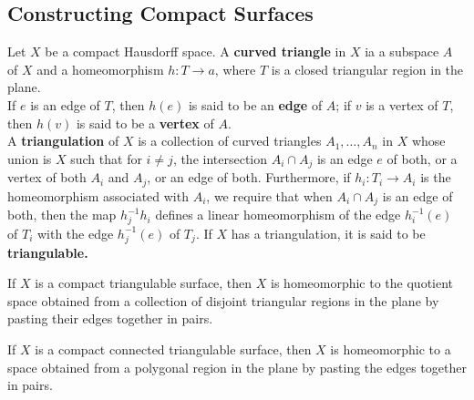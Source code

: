 \subsection{Constructing Compact Surfaces}

\begin{definition}
Let $X$ be a compact Hausdorff space. A \textbf{curved triangle} in $X$ ia a subspace $A$ of $X$ and a homeomorphism $h \colon T \rightarrow a$, 
where $T$ is a closed triangular region in the plane. \\

If $e$ is an edge of $T$, then $h(e)$ is said to be an \textbf{edge} of $A$; if $v$ is a vertex of $T$, then $h(v)$ is said to be a \textbf{vertex} of $A$. \\

A \textbf{triangulation} of $X$ is a collection of curved triangles $A_1, \dots, A_n$ in $X$ whose union is $X$ such that for $i \neq j$, 
the intersection $A_i \cap A_j$ is an edge $e$ of both, or a vertex of both $A_i$ and $A_j$, or an edge of both. Furthermore, if $h_i \colon T_i \rightarrow A_i$ is the
homeomorphism associated with $A_i$, we require that when $A_i \cap A_j$ is an edge of both, then the map $h_j^{-1}h_i$ defines a linear homeomorphism
of the edge $h_i^{-1}(e)$ of $T_i$ with the edge $h_j^{-1}(e)$ of $T_j$. If $X$ has a triangulation, it is said to be \textbf{triangulable.}
\end{definition}

\begin{theorem}
If $X$ is a compact triangulable surface, then $X$ is homeomorphic to the quotient space obtained from a collection of disjoint triangular regions in the plane
by pasting their edges together in pairs.
\end{theorem}

\begin{theorem}
If $X$ is a compact connected triangulable surface, then $X$ is homeomorphic to a space obtained from a polygonal region in the plane by pasting the edges together in pairs.
\end{theorem}




